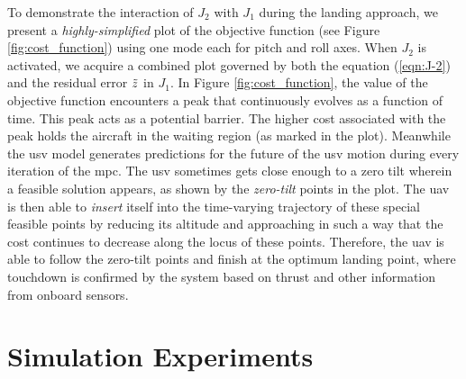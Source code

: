 \documentclass[letterpaper, 10 pt, journal, twoside]{IEEEtran}
\begin{document}
To demonstrate the interaction of $J_2$ with $J_1$ during the landing approach, we present a \textit{highly-simplified} plot of the objective function (see Figure \ref{fig:cost_function}) using one mode each for pitch and roll axes. 
When $J_2$ is activated, we acquire a combined plot governed by both the equation (\ref{eqn:J-2}) and the residual error $\Tilde{z}$ in $J_1$. In Figure \ref{fig:cost_function}, the value of the objective function encounters a peak that continuously evolves as a function of time. This peak acts as a potential barrier. The higher cost associated with the peak holds the aircraft in the waiting region (as marked in the plot). Meanwhile the \ac{usv} model generates predictions for the future of the \ac{usv} motion during every iteration of the \ac{mpc}. The \ac{usv} sometimes gets close enough to a zero tilt wherein a feasible solution appears, as shown by the \textit{zero-tilt} points in the plot. The \ac{uav} is then able to \textit{insert} itself into the time-varying trajectory of these special feasible points by reducing its altitude and approaching in such a way that the cost continues to decrease along the locus of these points. Therefore, the \ac{uav} is able to follow the zero-tilt points and finish at the optimum landing point, where touchdown is confirmed by the system based on thrust and other information from onboard sensors.



\section{Simulation Experiments}
\end{document}

